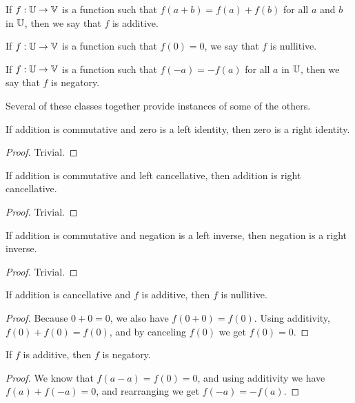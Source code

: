 \documentclass[../../math.tex]{subfiles}
\begin{document}
\begin{class}
    If $f : \mathbb{U} \to \mathbb{V}$ is a function such that $f(a + b) = f(a) + f(b)$ for all
    $a$ and $b$ in $\mathbb{U}$, then we say that $f$ is additive.
\end{class}

\begin{class}
    If $f : \mathbb{U} \to \mathbb{V}$ is a function such that $f(0) = 0$, we say that $f$ is
    nullitive.
\end{class}

\begin{class}
    If $f : \mathbb{U} \to \mathbb{V}$ is a function such that $f(-a) = -f(a)$ for all $a$ in
    $\mathbb{U}$, then we say that $f$ is negatory.
\end{class}

Several of these classes together provide instances of some of the others.

\begin{instance}
    If addition is commutative and zero is a left identity, then zero is a right
    identity.
\end{instance}
\begin{proof}
    Trivial.
\end{proof}

\begin{instance}
    If addition is commutative and left cancellative, then addition is right
    cancellative.
\end{instance}
\begin{proof}
    Trivial.
\end{proof}

\begin{instance}
    If addition is commutative and negation is a left inverse, then negation is
    a right inverse.
\end{instance}
\begin{proof}
    Trivial.
\end{proof}

\begin{instance}
    If addition is cancellative and $f$ is additive, then $f$ is nullitive.
\end{instance}
\begin{proof}
    Because $0 + 0 = 0$, we also have $f(0 + 0) = f(0)$.  Using additivity,
    $f(0) + f(0) = f(0)$, and by canceling $f(0)$ we get $f(0) = 0$.
\end{proof}

\begin{instance}
    If $f$ is additive, then $f$ is negatory.
\end{instance}
\begin{proof}
    We know that $f(a - a) = f(0) = 0$, and using additivity we have $f(a) +
    f(-a) = 0$, and rearranging we get $f(-a) = -f(a)$.
\end{proof}
\end{document}

